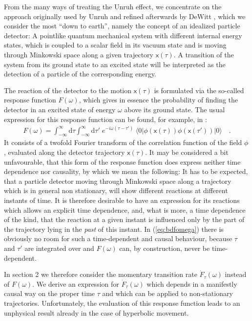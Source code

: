 \documentclass[a4paper,12pt]{article}
\newcommand{\bra}[1]{\langle #1|}
\newcommand{\ket}[1]{|#1\rangle }
\newcommand{\Fd}{\dot F_{\tau}(\omega)}
\newcommand{\vvx}{\mathsf x}
\newcommand{\vac}{\ket{0}}
\newcommand{\cav}{\bra{0}}
\newcommand{\infint}{\int_{-\infty}^\infty}
\renewcommand{\d}{\mathrm{d}}
\begin{document}
From the many ways of treating the Unruh effect, we concentrate
on the approach originally used by Unruh and refined afterwards by DeWitt \cite{dew}, 
which we consider the most ``down to earth'', namely the concept of an idealized 
particle detector: 
A pointlike quantum mechanical system with different internal 
energy states, which is coupled to a scalar field in its vacuum state and is
moving through Minkowski space along a given trajectory $\vvx(\tau)$. A transition 
of the system from its ground state to an excited state will be interpreted as the
detection of a particle of the corresponding energy.

The reaction of the detector to the motion $\vvx(\tau)$ is formulated via the 
so-called response function $F(\omega)$, which gives in essence the probability of 
finding the detector in an excited state of energy $\omega$ above its ground state.
The usual expression for this response function can be found, for example, in \cite{bd}:
\begin{eqnarray}
\label{eq:bdfomega}
F(\omega)=\infint\d\tau\infint\d\tau'\;e^{-i\omega(\tau-\tau')}\;
\cav\phi(\vvx(\tau))\phi(\vvx(\tau'))\vac\quad.
\end{eqnarray}
It consists of a twofold Fourier transform of the correlation function of the field 
$\phi$, evaluated along the detector trajectory $\vvx(\tau)$. 
It may be considered a bit unfavourable, that this form of the 
response function does express neither time dependence nor causality, by which we mean
the following: It has to be expected, that a particle detector moving through 
Minkowski space along a trajectory which is in general non stationary, will show 
different reactions at different instants of time. It is therefore desirable to have
an expression for its reactions which allows an explicit time dependence, and, what is
more, a time dependence of the kind, that the reaction at a given instant is influenced 
only by the part of the trajectory lying in the {\em past} of this instant. In 
(\ref{eq:bdfomega}) 
there is obviously no room for such a time-dependent and causal behaviour, because
$\tau$ and $\tau'$ are integrated over and $F(\omega)$ can, by construction, never
be time-dependent.

In section 2 we therefore consider the momentary transition rate $\Fd$ instead of
$F(\omega)$. We derive an expression for $\Fd$ which depends in a manifestly causal way
on the 
proper time $\tau$ and which can be applied to non-stationary trajectories. Unfortunately,
the evaluation of this response function leads to an unphysical result already in the 
case of hyperbolic movement.
\end{document}
